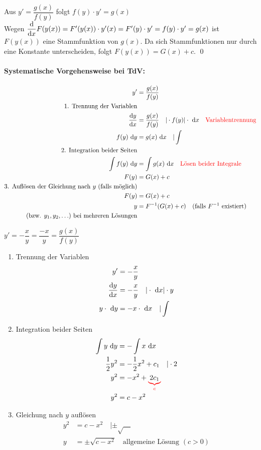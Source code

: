 \Beweis Aus $y'=\dfrac{g(x)}{f(y)}$ folgt $f(y)\cdot y'=g(x)$\\
Wegen $\dfrac{\mathrm{d}}{\mathrm{d}x}F(y(x))=F'(y(x))\cdot y'(x)=F'(y)\cdot y'=f(y)\cdot y'=g(x)$ ist $F(y(x))$ eine Stammfunktion von $g(x)$. Da sich Stammfunktionen nur durch eine Konstante unterscheiden, folgt $F(y(x))=G(x)+c$.
\qed

\paragraph{Systematische Vorgehensweise bei TdV:}\quad
\begin{align*}
y'&=\dfrac{g(x)}{f(y)}\\
\text{1. Trennung der Variablen}\\
\dfrac{\mathrm{d}y}{\mathrm{d}x}&=\dfrac{g(x)}{f(y)}\quad|\cdot f(y)|\cdot \ \mathrm{d}x\quad\textcolor{red}{\text{Variablentrennung}}\\
f(y)\ \mathrm{d}y&=g(x)\ \mathrm{d}x\quad|\int\\
\text{2. Integration beider Seiten}\\
\int f(y)\ \mathrm{d}y&=\int g(x)\ \mathrm{d}x\quad\textcolor{red}{\text{Lösen beider Integrale}}\\
F(y)&=G(x)+c\\
\text{3. Auflösen der Gleichung nach }y\text{ (falls möglich)}\\
F(y)&=G(x)+c\\
y&=F^{-1}(G(x)+c)\quad\text{(falls $F^{-1}$ existiert)}\\
\text{(bzw. $y_1,y_2,\ldots$) bei mehreren Lösungen}
\end{align*}

\Bsp $y'=-\dfrac{x}{y}=\dfrac{-x}{y}=\dfrac{g(x)}{f(y)}$
\begin{enumerate}
	\item Trennung der Variablen
	\begin{align*}
	y'&=-\dfrac{x}{y}\\
	\dfrac{\mathrm{d}y}{\mathrm{d}x}&=-\dfrac{x}{y}\quad|\cdot\ \mathrm{d}x|\cdot y\\
	y\cdot\ \mathrm{d}y&=-x\cdot\ \mathrm{d}x\quad|\int
	\end{align*}
	
	\item Integration beider Seiten
	\begin{align*}
	\int y\intd{y}&=-\int x\intd{x}\\
	\frac{1}{2}y^2&=-\frac{1}{2}x^2+c_1\quad|\cdot2\\
	y^2&=-x^2+\redunderbrace{2c_1}{c}\\
	y^2&=c-x^2
	\end{align*}
	
	\item Gleichung nach $y$ auflösen
	\begin{align*}
		y^2&=c-x^2\quad|\pm\sqrt{\quad}\\
		y&=\pm\sqrt{c-x^2}\quad\text{allgemeine Lösung }(c>0)
	\end{align*}
\end{enumerate}


